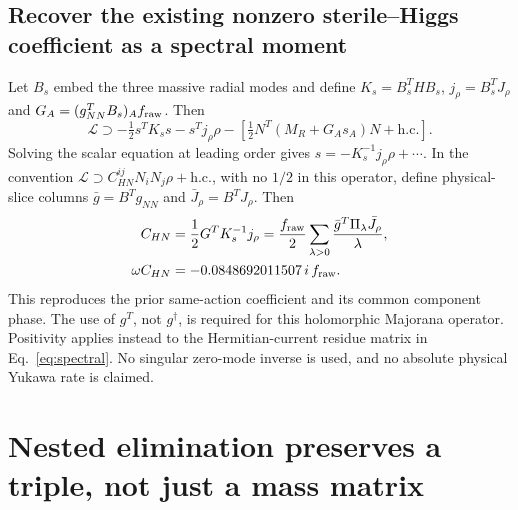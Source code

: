 \documentclass[11pt]{article}
\begin{document}
\subsection{Recover the existing nonzero sterile--Higgs coefficient as a spectral moment}
Let $B_s$ embed the three massive radial modes and define
$K_s=B_s^THB_s$, $j_\rho=B_s^TJ_\rho$ and
$G_A=(g_{NN}^TB_s)_A f_{\rm raw}$. Then
\begin{equation}
 \mathcal L\supset-\tfrac12s^TK_s s-s^Tj_\rho\rho
 -\left[\tfrac12N^T(M_R+G_As_A)N+\mathrm{h.c.}\right].
\end{equation}
Solving the scalar equation at leading order gives
$s=-K_s^{-1}j_\rho\rho+\cdots$. In the convention
$\mathcal L\supset C_{HN}^{ij}N_iN_j\rho+\mathrm{h.c.}$, with no
$1/2$ in this operator, define physical-slice columns
$\bar g=B^Tg_{NN}$ and $\bar J_\rho=B^TJ_\rho$. Then
\begin{align}
 C_{HN}&=\frac12G^TK_s^{-1}j_\rho
 =\frac{f_{\rm raw}}2\sum_{\lambda>0}
       \frac{\bar g^T\Pi_\lambda\bar J_\rho}{\lambda},\\
 \omega C_{HN}&=-0.0848692011507\,i\,f_{\rm raw}.
\end{align}
This reproduces the prior same-action coefficient and its common
component phase. The use of $g^T$, not $g^\dagger$, is required for this
holomorphic Majorana operator. Positivity applies instead to the
Hermitian-current residue matrix in Eq.~\eqref{eq:spectral}. No singular
zero-mode inverse is used, and no absolute physical Yukawa rate is claimed.

\section{Nested elimination preserves a triple, not just a mass matrix}
\end{document}
